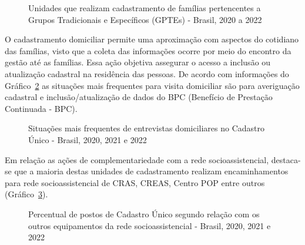 \documentclass[
  letterpaper,
  DIV=11,
  numbers=noendperiod]{scrreprt}
\begin{document}
\begin{figure}


\caption{\label{fig-gptes-cadunico}Unidades que realizam cadastramento
de famílias pertencentes a Grupos Tradicionais e Específicos (GPTEs) -
Brasil, 2020 a 2022}

\end{figure}%

O cadastramento domiciliar permite uma aproximação com aspectos do
cotidiano das famílias, visto que a coleta das informações ocorre por
meio do encontro da gestão até as famílias. Essa ação objetiva assegurar
o acesso a inclusão ou atualização cadastral na residência das pessoas.
De acordo com informações do Gráfico~\ref{fig-visit_dom} as situações
mais frequentes para visita domiciliar são para averiguação cadastral e
inclusão/atualização de dados do BPC (Benefício de Prestação Continuada
- BPC).

\begin{figure}


\caption{\label{fig-visit_dom}Situações mais frequentes de entrevistas
domiciliares no Cadastro Único - Brasil, 2020, 2021 e 2022}

\end{figure}%

Em relação as ações de complementariedade com a rede socioassistencial,
destaca-se que a maioria destas unidades de cadastramento realizam
encaminhamentos para rede socioassistencial de CRAS, CREAS, Centro POP
entre outros (Gráfico~\ref{fig-redesuas}).

\begin{figure}


\caption{\label{fig-redesuas}Percentual de postos de Cadastro Único
segundo relação com os outros equipamentos da rede socioassistencial -
Brasil, 2020, 2021 e 2022}

\end{figure}%
\end{document}

